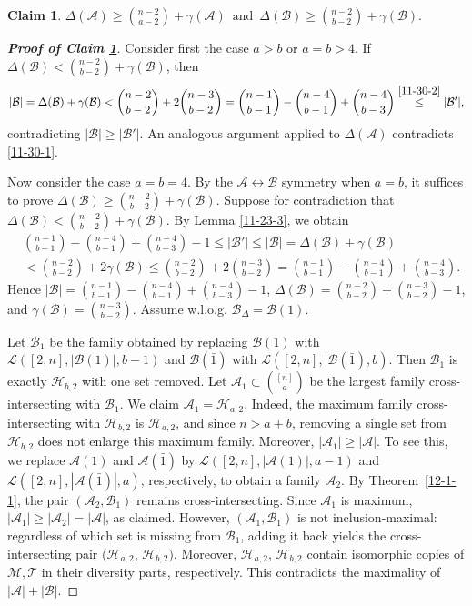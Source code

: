 \documentclass[11pt]{article}
\newcommand{\m}{\mathcal}
\newtheorem{claim}[theorem]{Claim}
\begin{document}

\begin{claim}\label{5-1-1}
    $\Delta(\mathcal{A})\ge {n-2\choose a-2}+\gamma(\mathcal{A}) \,\text{ and }\, \Delta(\mathcal{B})\ge {n-2\choose b-2}+\gamma(\mathcal{B}).$
\end{claim}

\begin{proof}[\bf{Proof of Claim \ref{5-1-1}}]
Consider first the case $a>b$ or $a=b>4$. 
If $\Delta(\m B)<{n-2\choose b-2}+\gamma(\m B)$, then 
$$|\m B|=\Delta(\m B)+\gamma(\m B)<{n-2\choose b-2}+2{n-3\choose b-2} = {n-1\choose b-1}-{n-4\choose b-1}+{n-4\choose b-3}\overset{\eqref{11-30-2}}{\le}|\m B'|,$$
contradicting $|\m B|\ge |\m B'|$. An analogous argument applied to $\Delta(\m A)$ contradicts \eqref{11-30-1}. 

Now consider the case $a=b=4.$ By the $\m A \leftrightarrow \m B$ symmetry when $a=b$, it suffices to prove $\Delta(\mathcal{B})\ge {n-2\choose b-2}+\gamma(\mathcal{B})$. 
Suppose for contradiction that $\Delta(\mathcal{B})< {n-2\choose b-2}+\gamma(\mathcal{B})$. By Lemma \ref{11-23-3}, we obtain
\begin{align*}
&{n-1\choose b-1}-{n-4\choose b-1}+{n-4\choose b-3}-1\le |\m B'|\le |\m B|=\Delta(\m B)+\gamma(\m B)\\
&<{n-2\choose b-2}+2\gamma(\m B)\le {n-2\choose b-2}+2{n-3\choose b-2}={n-1\choose b-1}-{n-4\choose b-1}+{n-4\choose b-3}.
\end{align*}
Hence $|\mathcal{B}|=\binom{n-1}{b-1}-\binom{n-4}{b-1}+\binom{n-4}{b-3}-1$, 
$\Delta(\mathcal{B})=\binom{n-2}{b-2}+\binom{n-3}{b-2}-1$, and 
$\gamma(\mathcal{B})=\binom{n-3}{b-2}$.
Assume w.l.o.g. $\m B_\Delta = \m B(1)$.


Let $\m B_1$ be the family obtained by replacing $\m B(1)$ with $\m L([2,n],|\m B(1)| ,b-1)$ and  $\m B(\bar 1)$  with  $\m L([2,n],|\m B(\bar 1),b)$. Then $\m B_1$ is exactly $\m H_{b,2}$ with one set removed. 
Let $\m A_1\subset \binom{[n]}{a}$ be the largest family cross-intersecting with $\m B_1$.
We claim $\m A_1=\m H_{a,2}$. Indeed, the maximum family cross-intersecting with $\m H_{b,2}$ is $\m H_{a,2}$, and since $n>a+b$, removing a single set from $\m H_{b,2}$ does not enlarge this maximum family.
Moreover, $|\m A_1|\ge |\m A|$. To see this, we replace $\m A(1)$ and $\m A(\bar 1)$ by $\m L([2,n],|\m A(1)| ,a-1)$ and $\m L([2,n],|\m A(\bar 1)| ,a)$, respectively, to obtain a family $\m A_2$. 
By Theorem~\ref{12-1-1}, the pair $(\m A_2, \m B_1)$ remains cross-intersecting. 
Since $\m A_1$ is maximum, $|\m A_1|\ge |\m A_2|=|\m A|$, as claimed.
However, $(\m A_1,\m B_1)$ is not inclusion-maximal: 
regardless of which set is missing from $\m B_1$, adding it back yields the cross-intersecting pair $(\m H_{a,2}$, $\m H_{b,2})$.
Moreover, $\m H_{a,2}$, $\m H_{b,2}$ contain isomorphic copies of $\m M, \m T$ in their diversity parts, respectively. 
This contradicts the maximality of $|\m A|+|\m B|$. 
\end{proof}
\end{document}

